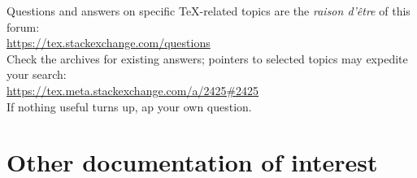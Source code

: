 \medpip
Questions and answers on specific \TeX-related topics are the
\emph{raison d'\^etre} of this forum:\\
\null\hspace{2\parindent}
\url{https://tex.stackexchange.com/questions}\\
Check the archives for existing answers; pointers to selected topics
may expedite your search:\\
\null\hspace{2\parindent}
\url{https://tex.meta.stackexchange.com/a/2425#2425}\\
If nothing useful turns up, ap your own question.



\section{Other documentation of interest}

